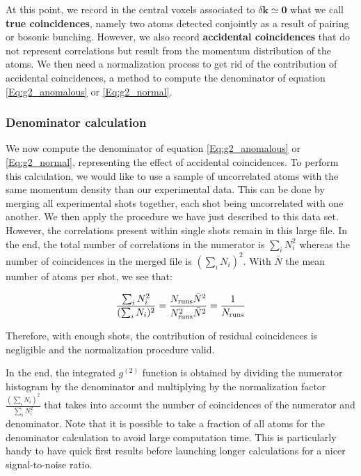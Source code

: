 At this point, we record in the central voxels associated to $\delta \bm{k} \simeq \bm{0}$ what we call \textbf{true coincidences}, namely two atoms detected conjointly as a result of \kmk pairing or bosonic bunching. However, we also record \textbf{accidental coincidences} that do not represent correlations but result from the momentum distribution of the atoms. We then need a normalization process to get rid of the contribution of accidental coincidences, \ie a method to compute the denominator of equation \ref{Eq:g2_anomalous} or \ref{Eq:g2_normal}.

\subsubsection{Denominator calculation}

\label{sec:algo}

We now compute the denominator of equation \ref{Eq:g2_anomalous} or \ref{Eq:g2_normal}, representing the effect of accidental coincidences. To perform this calculation, we would like to use a sample of uncorrelated atoms with the same momentum density than our experimental data. This can be done by merging all experimental shots together, each shot being uncorrelated with one another. We then apply the procedure we have just described to this data set. However, the correlations present within single shots remain in this large file. In the end, the total number of correlations in the numerator is $\sum_i N_i^2$ whereas the number of coincidences in the merged file is $(\sum_i N_i)^2$. With $\bar{N}$ the mean number of atoms per shot, we see that:

\begin{equation}
      \frac{\sum_i N_i^2}{(\sum_i N_i)^2}=\frac{N_{\rm{runs}} \bar{N}^2}{N_{\rm{runs}}^2 \bar{N}^2}=\frac{1}{N_{\rm{runs}}}
\end{equation}{}

\noindent Therefore, with enough shots, the contribution of residual coincidences is negligible and the normalization procedure valid. 

In the end, the integrated $g^{(2)}$ function is obtained by dividing the numerator histogram by the denominator and multiplying by the normalization factor $\frac{(\sum_i N_i)^2}{\sum_i N_i^2}$ that takes into account the number of coincidences of the numerator and denominator. Note that it is possible to take a fraction of all atoms for the denominator calculation to avoid large computation time. This is particularly handy to have quick first results before launching longer calculations for a nicer signal-to-noise ratio.



